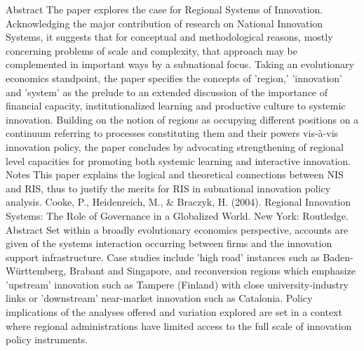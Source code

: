 \documentclass[a4paper,11pt]{article}
\begin{document}
Abstract
The paper explores the case for Regional Systems of Innovation. Acknowledging the major contribution of research on National Innovation Systems, it suggests that for conceptual and methodological reasons, mostly concerning problems of scale and complexity, that approach may be complemented in important ways by a subnational focus. Taking an evolutionary economics standpoint, the paper specifies the concepts of 'region,' 'innovation' and 'system' as the prelude to an extended discussion of the importance of financial capacity, institutionalized learning and productive culture to systemic innovation. Building on the notion of regions as occupying different positions on a continuum referring to processes constituting them and their powers vis-à-vis innovation policy, the paper concludes by advocating strengthening of regional level capacities for promoting both systemic learning and interactive innovation.
Notes
This paper explains the logical and theoretical connections between NIS and RIS, thus to justify the merits for RIS in subnational innovation policy analysis.
Cooke, P., Heidenreich, M., & Braczyk, H. (2004). Regional Innovation Systems: The Role of Governance in a Globalized World. New York: Routledge.
Abstract
Set within a broadly evolutionary economics perspective, accounts are given of the systems interaction occurring between firms and the innovation support infrastructure. Case studies include 'high road' instances such as Baden- Württemberg, Brabant and Singapore, and reconversion regions which emphasize 'upstream' innovation such as Tampere (Finland) with close university-industry links or 'downstream' near-market innovation such as Catalonia. Policy implications of the analyses offered and variation explored are set in a context where regional administrations have limited access to the full scale of innovation policy instruments.
 
\end{document}
